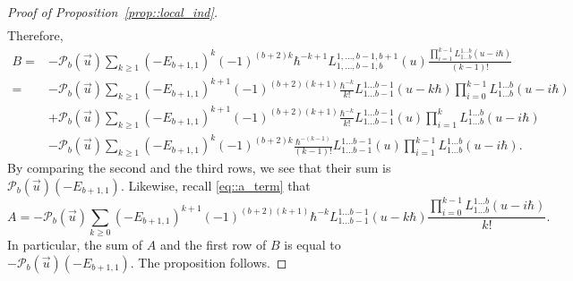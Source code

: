 \documentclass[10pt,a4paper]{article}
\numberwithin{equation}{section}
\newcommand{\calP}{\mathcal{P}}
\begin{document}
\begin{proof}[Proof of Proposition~\ref{prop::local_ind}]
\begin{gather*}
		\end{gather*}
		Therefore,
		\begin{align*}
			B ={}&-\calP_{b}(\vec{u})\sum\limits_{k\geq 1} (-E_{b+1,1})^k (-1)^{(b+2)k} \hbar^{-k+1} L_{1,\dots,b-1,b}^{1,\dots,b-1,b+1}(u) \frac{\prod_{i=1}^{k-1} L_{1\dots b}^{1\dots b}(u-i\hbar)}{(k-1)!} \\
			={}&-\calP_{b}(\vec{u})\sum\limits_{k\geq 1} (-E_{b+1,1})^{k+1} (-1)^{(b+2)(k+1)} \frac{\hbar^{-k}}{k!} L_{1\dots b-1}^{1\dots b-1}(u-k\hbar) \prod_{i=0}^{k-1} L_{1\dots b}^{1\dots b}(u-i\hbar) \\
			&+ \calP_{b}(\vec{u})\sum\limits_{k\geq 1} (-E_{b+1,1})^{k+1} (-1)^{(b+2)(k+1)} \frac{\hbar^{-k}}{k!} L_{1\dots b-1}^{1\dots b-1}(u) \prod_{i=1}^{k} L_{1\dots b}^{1\dots b}(u-i\hbar) \\
			&- \calP_{b}(\vec{u})\sum\limits_{k\geq 1}(-E_{b+1,1})^k (-1)^{(b+2)k} \frac{\hbar^{-(k-1)}}{(k-1)!} L_{1\dots b-1}^{1\dots b-1}(u) \prod_{i=1}^{k-1} L_{1\dots b}^{1\dots b}(u-i\hbar).
		\end{align*}
		By comparing the second and the third rows, we see that their sum is $\calP_{b}(\vec{u})(-E_{b+1,1})$. Likewise, recall \eqref{eq::a_term} that
		\[
		A = -\calP_{b}(\vec{u}) \sum\limits_{k\geq 0} (-E_{b+1,1})^{k+1} (-1)^{(b+2)(k+1)} \hbar^{-k} L_{1\dots b-1}^{1\dots b-1}(u-k\hbar) \frac{\prod_{i=0}^{k-1} L_{1\dots b}^{1\dots b}(u-i\hbar)}{k!}.
		\]
		In particular, the sum of $A$ and the first row of $B$ is equal to $-\calP_{b}(\vec{u})(-E_{b+1,1})$. The proposition follows.
	\end{proof}
	
\end{document}
